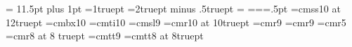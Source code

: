 %
%
\def\plainline#1{\hbox to \hsize{#1}}
\def\sin{\hbox{\rm sin}}
\def\cos{\hbox{\rm cos}}
\baselineskip = 11.5pt plus 1pt
\lineskiplimit=1truept
\lineskip=2truept minus .5truept
\newdimen\spread
\newdimen\myeqwidth
\myeqwidth=\hsize
\newdimen\mydp
\newdimen\myhtt
\newdimen\mydpp
\newdimen\mywidth
\newdimen\myht
\newdimen\allht
\newdimen\dimtwofive
\newdimen\pagewidth
\newdimen\pageheight
\newdimen{}
\pagewidth=\hsize \pageheight=\vsize {}=.5pt
\spread=2pt
\def\bestbreak{\par\penalty-9000}
\font\Lrm=cmss10 at 12truept 
\font\Lbf=cmbx10 %
\font\Lit=cmti10 %
\font\slsmall=cmsl9 %
\font\tenrm=cmr10 at 10truept
\font\rmsmall=cmr9
\font\ninerm=cmr9 
\font\fiverm=cmr5 
\font\eightrm=cmr8 at 8 truept
\font\ttexample=cmtt9
\font\tteight=cmtt8 at 8truept
\newfam\boldfam

\def\supereject{\newpage}




\def\bs{\char92}

\def\sloppy{\tolerance 2000 \hfuzz .5pt \vfuzz .5pt}
\def\fussy{\tolerance 200 \hfuzz .1pt \vfuzz .1pt}

\let\3=\ss
{}

